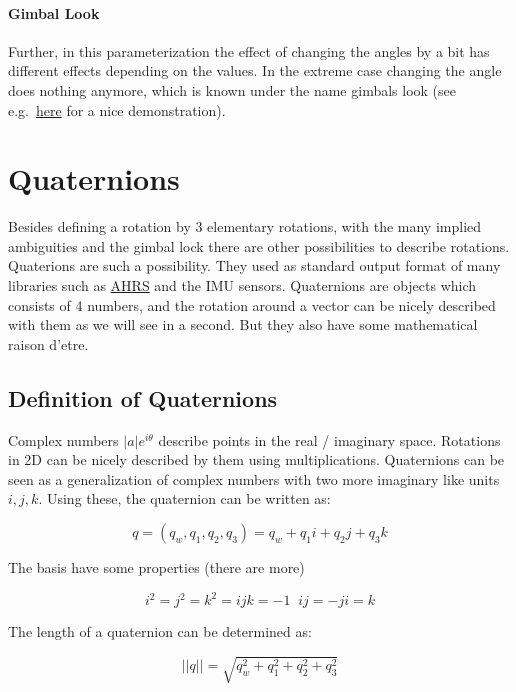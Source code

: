 \documentclass[
  letterpaper,
  DIV=11,
  numbers=noendperiod]{scrartcl}
\let\oldparagraph\paragraph
\renewcommand{\paragraph}[1]{\oldparagraph{#1}\mbox{}}
\begin{document}
\hypertarget{gimbal-look}{%
\paragraph{Gimbal Look}\label{gimbal-look}}

Further, in this parameterization the effect of changing the angles by a
bit has different effects depending on the values. In the extreme case
changing the angle does nothing anymore, which is known under the name
gimbals look (see
e.g.~\href{https://towardsdatascience.com/better-rotation-representations-for-accurate-pose-estimation-e890a7e1317f}{here}
for a nice demonstration).

\hypertarget{quaternions}{%
\section{Quaternions}\label{quaternions}}

Besides defining a rotation by 3 elementary rotations, with the many
implied ambiguities and the gimbal lock there are other possibilities to
describe rotations. Quaterions are such a possibility. They used as
standard output format of many libraries such as
\href{https://ahrs.readthedocs.io/en/latest/index.html\#}{AHRS} and the
IMU sensors. Quaternions are objects which consists of 4 numbers, and
the rotation around a vector can be nicely described with them as we
will see in a second. But they also have some mathematical raison
d'etre.

\hypertarget{definition-of-quaternions}{%
\subsection{Definition of Quaternions}\label{definition-of-quaternions}}

Complex numbers \(|a|e^{i \theta}\) describe points in the real /
imaginary space. Rotations in 2D can be nicely described by them using
multiplications. Quaternions can be seen as a generalization of complex
numbers with two more imaginary like units \(i,j,k\). Using these, the
quaternion can be written as:

\[
q =  (q_w, q_1, q_2, q_3) = q_w + q_1 i + q_2 j + q_3 k
\]

The basis have some properties (there are more)

\[
  i^2=j^2=k^2=ijk=-1 \;\; ij = -ji = k 
\]

The length of a quaternion can be determined as:

\[
  ||q|| = \sqrt{q_w^2 + q_1^2 + q_2^2 + q_3^2 }
\]
\end{document}
